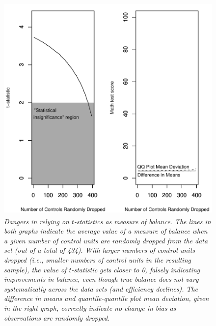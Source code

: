 \documentclass[11pt,titlepage]{article}
\begin{document}
\begin{figure}[t]
  \centering
  \includegraphics[height=4.5in]{figs/TStatPlotR0MATH}
  \caption{\em Dangers in relying on $t$-statistics as measure of balance.
    The lines in both graphs indicate the average value of a measure
    of balance when a given number of control units are randomly
    dropped from the data set (out of a total of 434).  With larger
    numbers of control units dropped (i.e., smaller numbers of control
    units in the resulting sample), the value of $t$-statistic gets
    closer to 0, falsely indicating improvements in balance, even
    though true balance does not vary systematically across the data
    sets (and efficiency declines).  The difference in means and
    quantile-quantile plot mean deviation, given in the right graph,
    correctly indicate no change in bias as observations are randomly
    dropped.}
  \label{f:randrop}
\end{figure}
\end{document}
